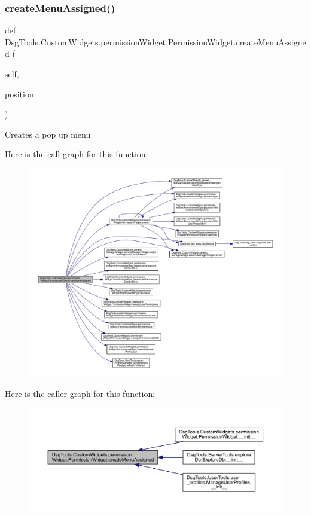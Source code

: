 \subsubsection{\texorpdfstring{create\+Menu\+Assigned()}{createMenuAssigned()}}
{\footnotesize\ttfamily def Dsg\+Tools.\+Custom\+Widgets.\+permission\+Widget.\+Permission\+Widget.\+create\+Menu\+Assigned (\begin{DoxyParamCaption}\item[{}]{self,  }\item[{}]{position }\end{DoxyParamCaption})}

\begin{DoxyVerb}Creates a pop up menu
\end{DoxyVerb}
 Here is the call graph for this function\+:
\nopagebreak
\begin{figure}[H]
\begin{center}
\leavevmode
\includegraphics[width=350pt]{class_dsg_tools_1_1_custom_widgets_1_1permission_widget_1_1_permission_widget_a7394c765970d6044a57778f790a4fe5e_cgraph}
\end{center}
\end{figure}
Here is the caller graph for this function\+:
\nopagebreak
\begin{figure}[H]
\begin{center}
\leavevmode
\includegraphics[width=350pt]{class_dsg_tools_1_1_custom_widgets_1_1permission_widget_1_1_permission_widget_a7394c765970d6044a57778f790a4fe5e_icgraph}
\end{center}
\end{figure}
